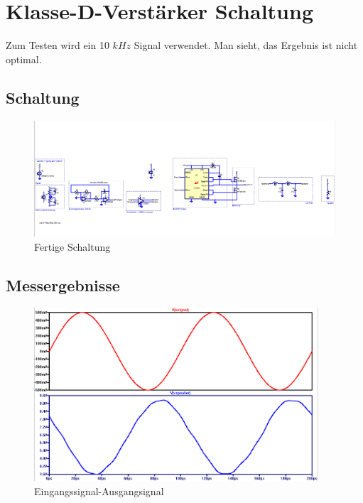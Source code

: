 \documentclass[11pt,a4paper,bibtotoc,oneside]{scrbook}
\begin{document}
\chapter{Klasse-D-Verstärker Schaltung}
Zum Testen wird ein 10 $ kHz$ Signal verwendet. Man sieht, das Ergebnis ist nicht optimal.
\section{Schaltung}
\begin{figure}[h]
\centering
    \includegraphics[width=400pt]{./picture/all.png}
    \caption{\label{all}Fertige Schaltung}
\end{figure}

\section{Messergebnisse}
\begin{figure}[ht]
    \centering
        \includegraphics[width=300pt]{./picture/input_output.png}
        \caption{\label{lc}{Eingangssignal-Ausgangsignal}}
    \end{figure}
\end{document}
